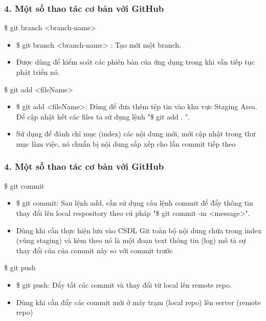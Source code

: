 \documentclass{beamer}
\begin{document}

\begin{frame}
\frametitle{ 4. Một số thao tác cơ bản với GitHub}

\begin{block}{ \$ git branch <branch-name>}
\begin{itemize}
\item \$ git branch <branch-name> : Tạo mới một branch.
\item Được dùng để kiểm soát các phiên bản của ứng dụng trong khi vẫn tiếp tục phát triển nó.
\end{itemize}
\end{block}

\begin{block}{ \$ git add <fileName>}
\begin{itemize}
\item \$ git add <fileName>: Dùng để đưa thêm tệp tin vào khu vực Staging Area. Để cập nhật hết các files ta sử dụng lệnh "\$ git add . ".
\item Sử dụng để đánh chỉ mục (index) các nội dung mới, mới cập nhật trong thư mục làm việc, nó chuẩn bị nội dung sắp xếp cho lần commit tiếp theo 
\end{itemize}

\end{block}

\end{frame}


\begin{frame}
\frametitle{ 4. Một số thao tác cơ bản với GitHub}
\begin{block}{ \$ git commit}
\begin{itemize}
\item \$ git commit: Sau lệnh add, cần sử dụng câu lệnh commit để đẩy thông tin thay đổi lên local respository theo cú pháp "\$ git commit -m <message>".
\item Dùng khi cần thực hiện lưu vào CSDL Git toàn bộ nội dung chứa trong index (vùng staging) và kèm theo nó là một đoạn text thông tin (log) mô tả sự thay đổi của của commit này so với commit trước
\end{itemize}

\end{block}
\begin{block}{ \$ git push}
\begin{itemize}
\item \$ git push: Đẩy tất các commit và thay đổi từ local lên remote repo.
\item Dùng khi cần đẩy các commit mới ở máy trạm (local repo) lên server (remote repo)
\end{itemize}

\end{block}
\end{frame}
\end{document}
